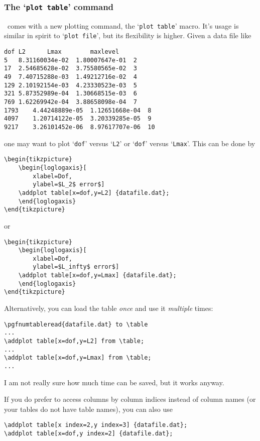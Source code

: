 \subsubsection{The `\texttt{plot table}' command}
\PGFPlots\ comes with a new plotting command, the `\texttt{plot table}' macro. It's usage is similar in spirit to `\texttt{plot file}', but its flexibility is higher. Given a data file like
\begin{lstlisting}[tabsize=8]
dof	L2		Lmax		maxlevel
5	8.31160034e-02	1.80007647e-01	2
17	2.54685628e-02	3.75580565e-02	3
49	7.40715288e-03	1.49212716e-02	4
129	2.10192154e-03	4.23330523e-03	5
321	5.87352989e-04	1.30668515e-03	6
769	1.62269942e-04	3.88658098e-04	7
1793	4.44248889e-05	1.12651668e-04	8
4097	1.20714122e-05	3.20339285e-05	9
9217	3.26101452e-06	8.97617707e-06	10
\end{lstlisting}
one may want to plot `\texttt{dof}' versus `\texttt{L2}' or `\texttt{dof}' versus `\texttt{Lmax}'. This can be done by
\begin{lstlisting}
\begin{tikzpicture}
	\begin{loglogaxis}[
		xlabel=Dof,
		ylabel=$L_2$ error$]
	\addplot table[x=dof,y=L2] {datafile.dat};
	\end{loglogaxis}
\end{tikzpicture}
\end{lstlisting}
or
\begin{lstlisting}
\begin{tikzpicture}
	\begin{loglogaxis}[
		xlabel=Dof,
		ylabel=$L_infty$ error$]
	\addplot table[x=dof,y=Lmax] {datafile.dat};
	\end{loglogaxis}
\end{tikzpicture}
\end{lstlisting}
Alternatively, you can load the table \emph{once} and use it \emph{multiple} times:
\begin{lstlisting}
\pgfnumtableread{datafile.dat} to \table
...
\addplot table[x=dof,y=L2] from \table;
...
\addplot table[x=dof,y=Lmax] from \table;
...
\end{lstlisting}
I am not really sure how much time can be saved, but it works anyway.

If you do prefer to access columns by column indices instead of column names (or your tables do not have table names), you can also use
\begin{lstlisting}
\addplot table[x index=2,y index=3] {datafile.dat};
\addplot table[x=dof,y index=2] {datafile.dat};
\end{lstlisting}

